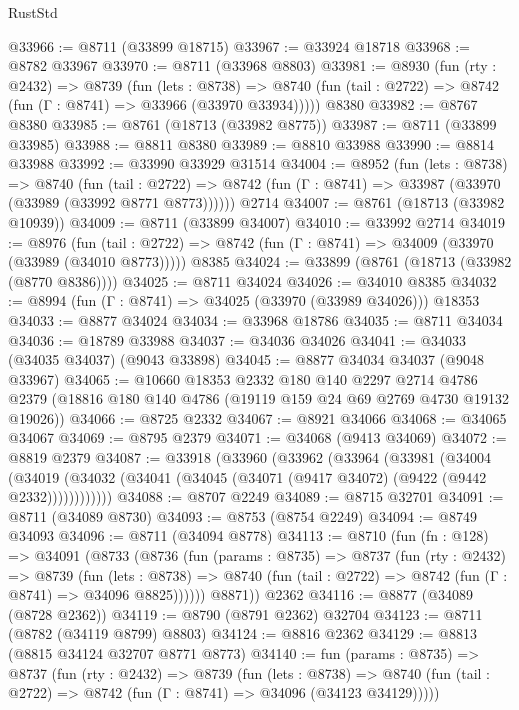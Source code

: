 \begin{lexlean}{RustStd}
\begin{coremodule}
@33966 := @8711 (@33899 @18715)
@33967 := @33924 @18718
@33968 := @8782 @33967
@33970 := @8711 (@33968 @8803)
@33981 := @8930
    (fun (rty : @2432) =>
    @8739
      (fun (lets : @8738) =>
      @8740 (fun (tail : @2722) => @8742 (fun (Γ : @8741) => @33966 (@33970 @33934)))))
    @8380
@33982 := @8767 @8380
@33985 := @8761 (@18713 (@33982 @8775))
@33987 := @8711 (@33899 @33985)
@33988 := @8811 @8380
@33989 := @8810 @33988
@33990 := @8814 @33988
@33992 := @33990 @33929 @31514
@34004 := @8952
    (fun (lets : @8738) =>
    @8740
      (fun (tail : @2722) =>
      @8742 (fun (Γ : @8741) => @33987 (@33970 (@33989 (@33992 @8771 @8773))))))
    @2714
@34007 := @8761 (@18713 (@33982 @10939))
@34009 := @8711 (@33899 @34007)
@34010 := @33992 @2714
@34019 := @8976
    (fun (tail : @2722) => @8742 (fun (Γ : @8741) => @34009 (@33970 (@33989 (@34010 @8773)))))
    @8385
@34024 := @33899 (@8761 (@18713 (@33982 (@8770 @8386))))
@34025 := @8711 @34024
@34026 := @34010 @8385
@34032 := @8994 (fun (Γ : @8741) => @34025 (@33970 (@33989 @34026))) @18353
@34033 := @8877 @34024
@34034 := @33968 @18786
@34035 := @8711 @34034
@34036 := @18789 @33988
@34037 := @34036 @34026
@34041 := @34033 (@34035 @34037) (@9043 @33898)
@34045 := @8877 @34034 @34037 (@9048 @33967)
@34065 := @10660
    @18353
    @2332
    @180
    @140
    @2297
    @2714
    @4786
    @2379
    (@18816 @180 @140 @4786 (@19119 @159 @24 @69 @2769 @4730 @19132 @19026))
@34066 := @8725 @2332
@34067 := @8921 @34066
@34068 := @34065 @34067
@34069 := @8795 @2379
@34071 := @34068 (@9413 @34069)
@34072 := @8819 @2379
@34087 := @33918
    (@33960
      (@33962
        (@33964
          (@33981
            (@34004
              (@34019 (@34032 (@34041 (@34045 (@34071 (@9417 @34072) (@9422 (@9442 @2332))))))))))))
@34088 := @8707 @2249
@34089 := @8715 @32701
@34091 := @8711 (@34089 @8730)
@34093 := @8753 (@8754 @2249)
@34094 := @8749 @34093
@34096 := @8711 (@34094 @8778)
@34113 := @8710
    (fun (fn : @128) =>
    @34091
      (@8733
        (@8736
          (fun (params : @8735) =>
          @8737
            (fun (rty : @2432) =>
            @8739
              (fun (lets : @8738) =>
              @8740 (fun (tail : @2722) => @8742 (fun (Γ : @8741) => @34096 @8825))))))
        @8871))
    @2362
@34116 := @8877 (@34089 (@8728 @2362))
@34119 := @8790 (@8791 @2362) @32704
@34123 := @8711 (@8782 (@34119 @8799) @8803)
@34124 := @8816 @2362
@34129 := @8813 (@8815 @34124 @32707 @8771 @8773)
@34140 := fun (params : @8735) =>
  @8737
    (fun (rty : @2432) =>
    @8739
      (fun (lets : @8738) =>
      @8740 (fun (tail : @2722) => @8742 (fun (Γ : @8741) => @34096 (@34123 @34129)))))

\end{coremodule}
\end{lexlean}
